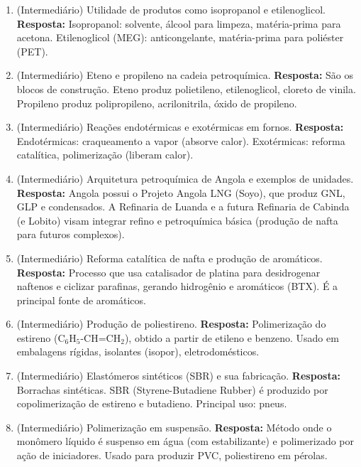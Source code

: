 \documentclass[11pt,a4paper]{article}
\begin{document}
\begin{enumerate}
  \item (Intermediário) Utilidade de produtos como isopropanol e etilenoglicol.
  \textbf{Resposta:} Isopropanol: solvente, álcool para limpeza, matéria-prima para acetona. Etilenoglicol (MEG): anticongelante, matéria-prima para poliéster (PET).

  \item (Intermediário) Eteno e propileno na cadeia petroquímica.
  \textbf{Resposta:} São os blocos de construção. Eteno produz polietileno, etilenoglicol, cloreto de vinila. Propileno produz polipropileno, acrilonitrila, óxido de propileno.

  \item (Intermediário) Reações endotérmicas e exotérmicas em fornos.
  \textbf{Resposta:} Endotérmicas: craqueamento a vapor (absorve calor). Exotérmicas: reforma catalítica, polimerização (liberam calor).

  \item (Intermediário) Arquitetura petroquímica de Angola e exemplos de unidades.
  \textbf{Resposta:} Angola possui o Projeto Angola LNG (Soyo), que produz GNL, GLP e condensados. A Refinaria de Luanda e a futura Refinaria de Cabinda (e Lobito) visam integrar refino e petroquímica básica (produção de nafta para futuros complexos).

  \item (Intermediário) Reforma catalítica de nafta e produção de aromáticos.
  \textbf{Resposta:} Processo que usa catalisador de platina para desidrogenar naftenos e ciclizar parafinas, gerando hidrogênio e aromáticos (BTX). É a principal fonte de aromáticos.

  \item (Intermediário) Produção de poliestireno.
  \textbf{Resposta:} Polimerização do estireno (C$_6$H$_5$-CH=CH$_2$), obtido a partir de etileno e benzeno. Usado em embalagens rígidas, isolantes (isopor), eletrodomésticos.

  \item (Intermediário) Elastómeros sintéticos (SBR) e sua fabricação.
  \textbf{Resposta:} Borrachas sintéticas. SBR (Styrene-Butadiene Rubber) é produzido por copolimerização de estireno e butadieno. Principal uso: pneus.

  \item (Intermediário) Polimerização em suspensão.
  \textbf{Resposta:} Método onde o monômero líquido é suspenso em água (com estabilizante) e polimerizado por ação de iniciadores. Usado para produzir PVC, poliestireno em pérolas.


\end{enumerate}
\end{document}
